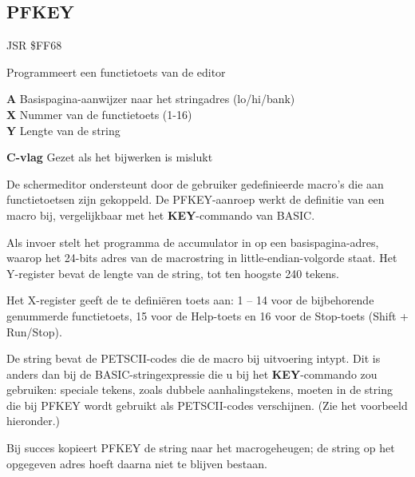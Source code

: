\subsection{PFKEY}
\label{KERNAL Jump Table!PFKEY}
\begin{description}[leftmargin=2cm,style=nextline]
    \item [Adres:] JSR \$FF68    \item [Omschrijving:] Programmeert een functietoets van de editor    \item [Invoer:]        \textbf{A} Basispagina-aanwijzer naar het stringadres (lo/hi/bank) \\        \textbf{X} Nummer van de functietoets (1-16) \\        \textbf{Y} Lengte van de string    \item [Uitvoer:]        \textbf{C-vlag} Gezet als het bijwerken is mislukt    \item [Opmerkingen:]        De schermeditor ondersteunt door de gebruiker gedefinieerde macro's die aan functietoetsen zijn gekoppeld. De PFKEY-aanroep werkt de definitie van een macro bij, vergelijkbaar met het \textbf{KEY}-commando van BASIC.

        Als invoer stelt het programma de accumulator in op een basispagina-adres, waarop het 24-bits adres van de macrostring in little-endian-volgorde staat. Het Y-register bevat de lengte van de string, tot ten hoogste 240 tekens.

        Het X-register geeft de te definiëren toets aan: 1 -- 14 voor de bijbehorende genummerde functietoets, 15 voor de Help-toets en 16 voor de Stop-toets (Shift + Run/Stop).

        De string bevat de PETSCII-codes die de macro bij uitvoering intypt. Dit is anders dan bij de BASIC-stringexpressie die u bij het \textbf{KEY}-commando zou gebruiken: speciale tekens, zoals dubbele aanhalingstekens, moeten in de string die bij PFKEY wordt gebruikt als PETSCII-codes verschijnen. (Zie het voorbeeld hieronder.)

        Bij succes kopieert PFKEY de string naar het macrogeheugen; de string op het opgegeven adres hoeft daarna niet te blijven bestaan.    \item [Voorbeeld:]
\end{description}



